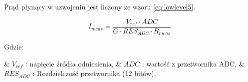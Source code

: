Prąd płynący w uzwojeniu jest liczony ze wzoru \ref{eq:lowlevel5}.

\begin{equation} \label{eq:lowlevel5}
	I_{meas} = \frac{V_{ref} \cdot ADC}{G \cdot RES_{ADC} \cdot R_{meas}}
\end{equation}

Gdzie:
\begin{easylist}
	& $ V_{ref} $ : napięcie źródła odniesienia,
	& $ ADC $ : wartość z przetwornika ADC,
	& $ RES_{ADC} $ : Rozdzielczość przetwornika (12 bitów),
\end{easylist} 





